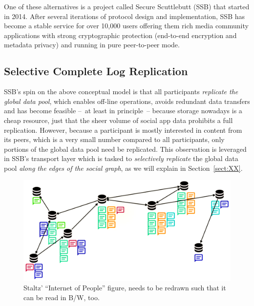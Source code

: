 \documentclass[sigconf]{acmart}
\begin{document}
One of these alternatives is a project called Secure Scuttlebutt (SSB)
that started in 2014. After several iterations of protocol design and
implementation, SSB has become a stable service for over 10,000 users
offering them rich media community applications with strong
cryptographic protection (end-to-end encryption and metadata privacy)
and running in pure peer-to-peer mode.

\subsection*{Selective Complete Log Replication}

SSB's spin on the above conceptual model is that all participants {\em
  replicate the global data pool}, which enables off-line operations,
avoids redundant data transfers and has become feasible --~at least in
principle~-- because storage nowadays is a cheap resource, just that
the sheer volume of social app data prohibits a full
replication. However, because a participant is mostly interested in
content from its peers, which is a very small number compared to all
participants, only portions of the global data pool need be
replicated. This observation is leveraged in SSB's transport layer
which is tasked to {\em selectively replicate} the global data pool
{\em along the edges of the social graph}, as we will explain in
Section~\ref{sect:XX}.

\begin{figure}[htb]
  \includegraphics[width=0.9\columnwidth]{figs/staltz-iop.pdf}
  \caption{Staltz' ``Internet of People'' figure, needs to be redrawn
    such that it can be read in B/W, too.}
\end{figure}
\end{document}
